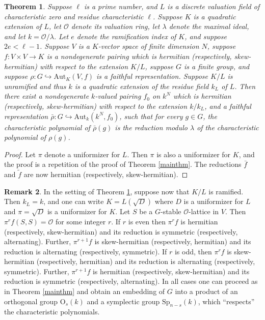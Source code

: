 \documentclass{amsart}
\def\f{{\tilde F}}
\def\Aut{\mathrm{Aut}}
\def\Sp{\mathrm{Sp}}
\def\f{f}
\def\OO{{\mathrm O}}
\def\O{{\mathcal O}}
\newtheorem{thm}{Theorem}
\theoremstyle{definition}
\newtheorem{rem}[thm]{Remark}
\begin{document}
\begin{thm}
\label{unitaryunram}
Suppose 
$\ell$ is a prime number, and $L$ is a discrete valuation field 
of characteristic zero and residue characteristic $\ell$.
Suppose $K$ is a quadratic extension of $L$, let $\O$ denote 
its valuation ring, let $\lambda$ denote the maximal
ideal, and let $k = \O/\lambda$. 
Let $e$ denote the ramification index of $K$, and 
suppose $2e<\ell-1$.
Suppose $V$ is a $K$-vector space of finite dimension $N$, 
suppose $\f:V \times V \to K$ is a nondegenerate 
pairing which is hermitian 
(respectively, skew-hermitian) with respect to the extension
$K/L$, suppose $G$ is a finite group, and 
suppose $\rho : G \hookrightarrow \Aut_K(V,{\f})$
is a faithful representation.
Suppose $K/L$ is unramified and thus 
$k$ is a quadratic extension of the residue
field $k_L$ of $L$. Then there exist a 
nondegenerate $k$-valued pairing ${\f}_0$ 
on $k^N$ which is hermitian  (respectively, skew-hermitian)
with respect to the
extension $k/k_L$, and 
a faithful representation
${\bar \rho} : G \hookrightarrow \Aut_k(k^N,{\f}_0)$,
such that for every $g \in G$, the characteristic
polynomial of ${\bar \rho}(g)$ is the reduction modulo
$\lambda$ of the characteristic polynomial of $\rho(g)$.
\end{thm}

\begin{proof}
Let $\pi$ denote a uniformizer for $L$. Then $\pi$ is
also a uniformizer for $K$, and 
the proof is a repetition of the proof of 
Theorem \ref{mainthm}. The reductions ${\bar \f}$ and 
${\tilde \f}$ are now hermitian (respectively, skew-hermitian).
\end{proof}

\begin{rem}
\label{unitaryram}
In the setting of Theorem \ref{unitaryunram},
suppose now that $K/L$ is ramified.
Then $k_L=k$, and one can write $K=L(\sqrt{D})$
where $D$ is a uniformizer for $L$ and
$\pi=\sqrt{D}$ is a uniformizer for $K$. Let $S$ be a
$G$-stable $\O$-lattice in $V$. Then 
$\pi^r\f(S,S)=\O$ for some integer $r$. If $r$ is even
then $\pi^r \f$ is hermitian (respectively,
skew-hermitian) and its reduction 
is symmetric (respectively, alternating). Further,
$\pi^{r+1}\f$ is skew-hermitian
(respectively, hermitian) and its reduction
is alternating (respectively, symmetric). 
If $r$ is odd, then 
$\pi^r\f$ is skew-hermitian (respectively,
hermitian) and its reduction is alternating 
(respectively, symmetric). Further, 
$\pi^{r+1}\f$ is hermitian
(respectively, skew-hermitian) and its reduction
is symmetric (respectively, alternating). 
In all cases one can proceed as in Theorem \ref{mainthm}
and obtain an embedding
of $G$ into a product of an orthogonal group $\OO_s(k)$ and a 
symplectic group $\Sp_{n-s}(k)$, which ``respects'' the 
characteristic polynomials. 
\end{rem}
\end{document}

